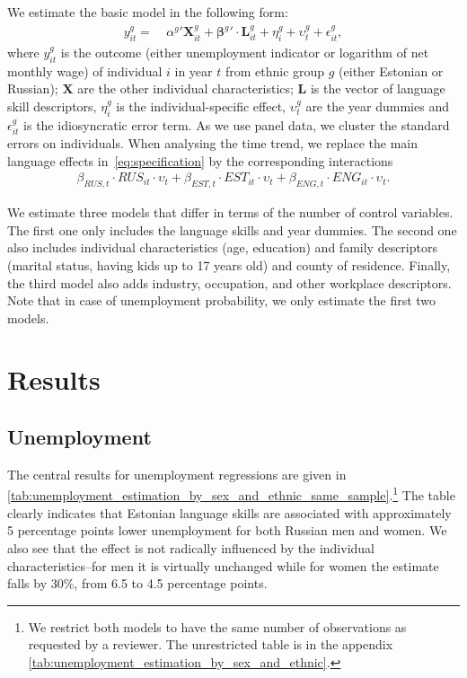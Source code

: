 \documentclass[12pt, a4paper]{article}
\renewcommand*{\vec}[1]{\boldsymbol{#1}}
\begin{document}
We estimate the basic model in the following form:
\begin{equation}
	\label{eq:specification}
	\begin{split}
		y_{it} ^{g} = &\: \alpha^{g}{}' \vec{X}_{it}^{g} + \vec{\beta}^{g}{}' \cdot \vec{L}_{it}^{g} +
		\eta_{i}^{g} +
		\upsilon_{t}^{g} + \epsilon_{it}^{g},
	\end{split}
\end{equation}
where $y_{it}^{g}$ is the outcome (either unemployment indicator
or logarithm of net monthly wage)
of individual $i$ in year $t$ from ethnic group $g$ (either Estonian
or Russian); $\vec{X}$ are the other individual
characteristics; $\vec{L}$ is the vector of
language skill descriptors, $\eta_{i}^{g}$ is the individual-specific effect, $\upsilon_{t}^{g}$ are the year dummies and $\epsilon_{it}^{g}$
is the idiosyncratic error term. 
As we use panel data, we cluster the
standard errors on individuals.  When analysing the time trend, we
replace the main language effects in~\eqref{eq:specification} by the
corresponding interactions
\begin{align}
	\label{eq:time_interaction}
	\beta_{RUS,t} \cdot RUS_{it} \cdot \upsilon_{t} +
	\beta_{EST,t} \cdot EST_{it} \cdot \upsilon_{t} +
	\beta_{ENG,t} \cdot ENG_{it} \cdot \upsilon_{t}.
\end{align}


We estimate three models that differ in terms of the number of
control variables. The first one only includes the language skills
and year dummies. The second one also includes individual
characteristics (age, education) and family descriptors (marital status, having kids up to 17 years old) and county of residence.
Finally, the third model also adds industry, occupation, and other
workplace descriptors.  Note that in case of unemployment probability,
we only estimate the first two models.


\section{Results}
\label{sec:results}
\subsection{Unemployment}
\label{subsec:basic_model_unemployment}

The central results for unemployment regressions are given in
\cref{tab:unemployment_estimation_by_sex_and_ethnic_same_sample}.\footnote{We
  restrict both models to have the same number of observations as
  requested by a reviewer. The unrestricted table is in the appendix \cref{tab:unemployment_estimation_by_sex_and_ethnic}.}
The
table clearly indicates that Estonian language skills are associated
with approximately 5 percentage points lower unemployment for both
Russian men and women. We also see that the effect is not radically
influenced by the individual characteristics--for men it is
virtually unchanged while for women the estimate falls by 30\%, from
6.5 to 4.5 percentage points.
\end{document}
